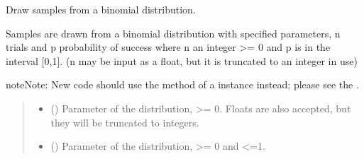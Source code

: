 \documentclass[letterpaper,10pt,english]{sphinxmanual}
\begin{document}
\begin{fulllineitems}
\label{\detokenize{metilda.controllers:metilda.controllers.pitch_art_wizard.binomial}}
\pysigstartsignatures
{}
\pysigstopsignatures
\sphinxAtStartPar
Draw samples from a binomial distribution.

\sphinxAtStartPar
Samples are drawn from a binomial distribution with specified
parameters, n trials and p probability of success where
n an integer \textgreater{}= 0 and p is in the interval {[}0,1{]}. (n may be
input as a float, but it is truncated to an integer in use)

\begin{sphinxadmonition}{note}{Note:}
\sphinxAtStartPar
New code should use the 
method of a  instance instead;
please see the .
\end{sphinxadmonition}
\begin{quote}\begin{description}
\begin{itemize}
\item {} 
\sphinxAtStartPar
{} () \textendash{} Parameter of the distribution, \textgreater{}= 0. Floats are also accepted,
but they will be truncated to integers.

\item {} 
\sphinxAtStartPar
{} () \textendash{} Parameter of the distribution, \textgreater{}= 0 and \textless{}=1.


\end{itemize}
\end{description}
\end{quote}
\end{fulllineitems}
\end{document}
